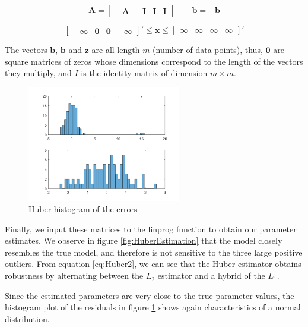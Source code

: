 \[
\mathbf{A} = \begin{bmatrix}
-\mathbf{A} & -\mathbf{I} & \mathbf{I} & \mathbf{I}
\end{bmatrix} 
\qquad
\mathbf{b} = -\mathbf{b} 
\]

\[
\begin{bmatrix}
-\mathbf{\infty} & \mathbf{0} & \mathbf{0} & -\mathbf{\infty}
\end{bmatrix}'
\leq \mathbf{x} \leq 
\begin{bmatrix}
\mathbf{\infty} & \mathbf{\infty} & \mathbf{\infty} & \mathbf{\infty}
\end{bmatrix}'
\]


The vectors $\mathbf{b}$, $\mathbf{b}$ and $\mathbf{z}$ are all length $m$ (number of data points), thus, $\mathbf{0}$ are square matrices of zeros whose dimensions correspond to the length of the vectors they multiply, and $I$ is the identity matrix of dimension $m \times m$. 

\begin{figure}[htb]
\centering
\includegraphics[width=0.6\textwidth]{../img/Huber_hist}
\caption{Huber histogram of the errors}
\label{fig:HuberHist}
\end{figure} 

Finally, we input these matrices to the linprog \matlab function to obtain our parameter estimates. We observe in figure \ref{fig:HuberEstimation} that the model  closely resembles the true model, and therefore is not sensitive to the three large positive outliers. From equation \ref{eq:Huber2}, we can see that the Huber estimator obtains robustness by alternating between the $L_2$ estimator and a hybrid of the $L_1$.



Since the estimated parameters are very close to the true parameter values, the histogram plot of the residuals in figure \ref{fig:HuberHist} shows again characteristics of a normal distribution.



